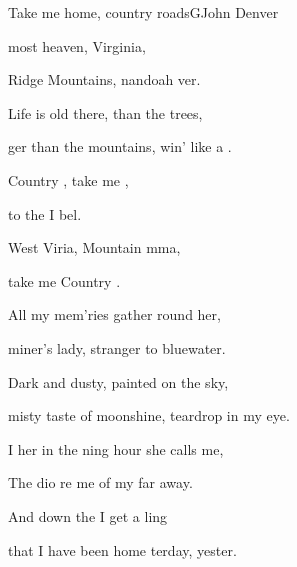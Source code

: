 \begin{song}{Take me home, country roads}{G}{John Denver}

\begin{SBVerse}


most heaven,  Virginia,

 Ridge Mountains, nandoah ver.

Life is old there,  than the trees,

ger than the mountains, win' like a .

\end{SBVerse}

\begin{SBChorus}

Country , take me ,

to the  I bel.

West Viria, Mountain mma,

take me  Country .

\end{SBChorus}

\begin{SBVerse}

All my mem'ries gather round her,

miner's lady, stranger to bluewater.

Dark and dusty, painted on the sky,

misty taste of moonshine, teardrop in my eye.

\end{SBVerse}

\begin{SBChorus}

\end{SBChorus}

\begin{SBChorus*}

I  her  in the ning hour she calls me,

The dio re me of my  far away.

And  down the  I get a ling

that I  have been home terday, yester.

\end{SBChorus*}

\begin{SBChorus}

\end{SBChorus}

\end{song}

\clearpage

